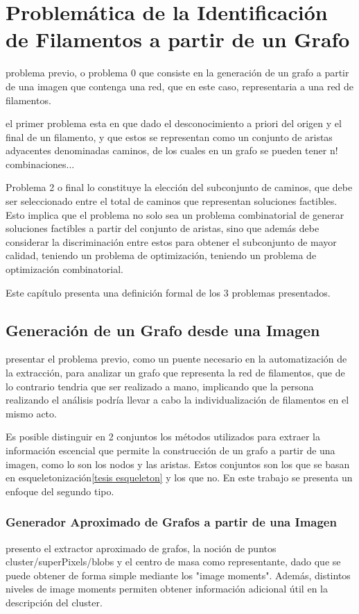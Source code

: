 \chapter{Problem\'atica de la Identificaci\'on de Filamentos a partir de un Grafo}

problema previo, o problema 0 que consiste en la generaci\'on de un grafo a partir de una imagen que contenga una red, que en este caso, representaria a una red de filamentos. 

el primer problema esta en que dado el desconocimiento a priori del origen y el final de un filamento, y que estos se representan como un conjunto de aristas adyacentes denominadas caminos, de los cuales en un grafo se pueden tener n! combinaciones...

Problema 2 o final lo constituye la elecci\'on del subconjunto de caminos, que debe ser seleccionado entre el total de caminos que representan soluciones factibles. Esto implica que el problema no solo sea un problema combinatorial de generar soluciones factibles a partir del conjunto de aristas, sino que adem\'as debe considerar la discriminaci\'on entre estos para obtener el subconjunto de mayor calidad, teniendo un problema de optimizaci\'on, teniendo un problema de optimizaci\'on combinatorial.

Este cap\'itulo presenta una definici\'on formal de los 3 problemas presentados.

\section{Generaci\'on de un Grafo desde una Imagen}
presentar el problema previo, como un puente necesario en la 
automatizaci\'on de la extracci\'on,  para analizar un grafo que representa la red de filamentos, que de lo contrario tendria que ser realizado a mano, implicando que la persona realizando el análisis podría llevar a cabo la individualizaci\'on de filamentos en el mismo acto.

Es posible distinguir en 2 conjuntos los m\'etodos utilizados para extraer la informaci\'on escencial que permite la construcci\'on de un grafo a partir de una imagen, como lo son los nodos y las aristas. Estos conjuntos son los que se basan en esqueletonizaci\'on\ref{tesis esqueleton} y los que no. En este trabajo se presenta un enfoque del segundo tipo.

\subsection{Generador Aproximado de Grafos a partir de una Imagen}
presento el extractor aproximado de grafos, la noción de puntos cluster/superPixels/blobs y el centro de masa como representante, dado que se puede obtener de forma simple mediante los "image moments". Además, distintos niveles de image moments permiten obtener información adicional útil en la descripción del cluster.

